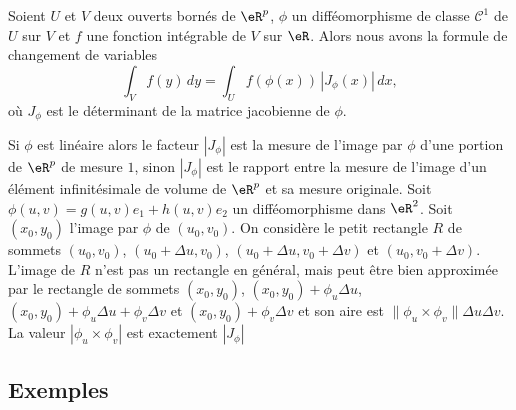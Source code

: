 \begin{theorem}		\label{ThoChmVarInt}
  Soient $U$ et $V$ deux ouverts bornés de $\eR^p$, $\phi$ un difféomorphisme de classe $\mathcal{C}^1$ de $U$ sur $V$ et $f$ une fonction intégrable de $V$ sur $\eR$. Alors nous avons la formule de changement de variables 
  \begin{equation}
    \int_{V}f(y)\, dy= \int_{U} f(\phi(x))\, \left| J_{\phi}(x)\right|\, dx,
  \end{equation}
  où $J_{\phi}$ est le déterminant de la matrice jacobienne de $\phi$. 
\end{theorem}
Si $\phi$ est linéaire  alors le facteur $|J_{\phi}|$ est la mesure de l'image par $\phi$ d'une portion de $\eR^p$ de mesure $1$, sinon  $|J_{\phi}|$ est le rapport entre la mesure de l'image d'un élément infinitésimale de volume de $\eR^p$ et sa mesure originale. 
Soit $\phi(u,v)=g(u,v)e_1+h(u,v)e_2$ un difféomorphisme dans $\eR^2$. Soit $(x_0, y_0)$ l'image par $\phi$ de $(u_0,v_0)$. On considère le petit rectangle $R$ de sommets $(u_0,v_0)$, $(u_0+\Delta u,v_0)$, $(u_0+\Delta u,v_0+\Delta v)$ et $(u_0,v_0+\Delta v)$. L'image de $R$ n'est pas un rectangle en général, mais peut être bien approximée par le rectangle de sommets $(x_0,y_0)$, $(x_0 ,y_0)+ \phi_{u}\Delta u$, $(x_0 ,y_0)+\phi_{u}\Delta u +\phi_{v}\Delta v$ et  $(x_0 ,y_0)+ \phi_{v}\Delta v$ et son aire est $\| \phi_{u}\times \phi_{v}\| \Delta u\Delta v$. La valeur $|\phi_{u}\times \phi_{v}|$ est exactement $|J_{\phi}|$ 

\subsection{Exemples}

